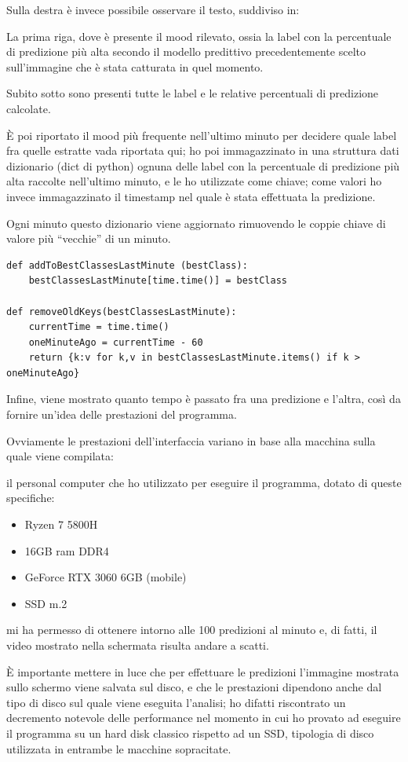 Sulla destra è invece possibile osservare il testo, suddiviso in:

La prima riga, dove è presente il mood rilevato, ossia la label con la percentuale di predizione più alta secondo il modello predittivo precedentemente scelto sull’immagine che è stata catturata in quel momento.

Subito sotto sono presenti tutte le label e le relative percentuali di predizione calcolate.

È poi riportato il mood più frequente nell’ultimo minuto per decidere quale label fra quelle estratte vada riportata qui; ho poi immagazzinato in una struttura dati dizionario (dict di python) ognuna delle label con la percentuale di predizione più alta raccolte nell’ultimo minuto, e le ho utilizzate come chiave; come valori ho invece immagazzinato il timestamp nel quale è stata effettuata la predizione.

Ogni minuto questo dizionario viene aggiornato rimuovendo le coppie chiave di valore più “vecchie” di un minuto. 
\begin{verbatim}
def addToBestClassesLastMinute (bestClass):
    bestClassesLastMinute[time.time()] = bestClass

def removeOldKeys(bestClassesLastMinute):
    currentTime = time.time()
    oneMinuteAgo = currentTime - 60
    return {k:v for k,v in bestClassesLastMinute.items() if k > oneMinuteAgo}
\end{verbatim}
Infine, viene mostrato quanto tempo è passato fra una predizione e l’altra, così da fornire un’idea delle prestazioni del programma.

Ovviamente le prestazioni dell’interfaccia variano in base alla macchina sulla quale viene compilata:

il personal computer che ho utilizzato per eseguire il programma, dotato di queste specifiche:
\begin{itemize}
    \item Ryzen 7 5800H
    \item 16GB ram DDR4
    \item GeForce RTX 3060 6GB (mobile)
    \item SSD m.2
\end{itemize}

mi ha permesso di ottenere intorno alle 100 predizioni al minuto e, di fatti, il video mostrato nella schermata risulta andare a scatti.

È importante mettere in luce che per effettuare le predizioni l’immagine mostrata sullo schermo viene salvata sul disco, e che le prestazioni dipendono anche dal tipo di disco sul quale viene eseguita l’analisi; ho difatti riscontrato un decremento notevole delle performance nel momento in cui ho provato ad eseguire il programma su un hard disk classico rispetto ad un SSD, tipologia di disco utilizzata in entrambe le macchine sopracitate.

